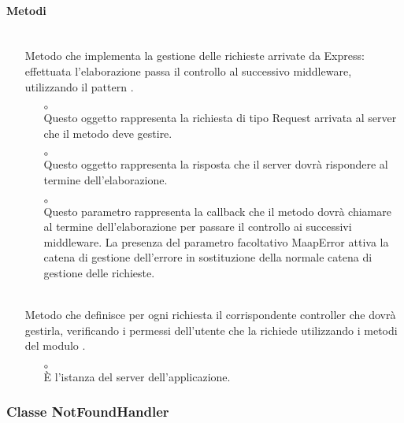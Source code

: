 \paragraph*{Metodi}
\begin{itemize}
\item[]  \\ Metodo che implementa la gestione delle richieste arrivate da Express: effettuata l'elaborazione passa il controllo al successivo middleware, utilizzando il pattern .
\begin{itemize}\addtolength{\itemsep}{-0.5\baselineskip}
\item[$\circ$]  \\ Questo oggetto rappresenta la richiesta di tipo Request arrivata al server che il metodo deve gestire.
\item[$\circ$]  \\ Questo oggetto rappresenta la risposta che il server dovrà rispondere al termine dell'elaborazione.
\item[$\circ$]  \\ Questo parametro rappresenta la callback che il metodo dovrà chiamare al termine dell'elaborazione per passare il controllo ai successivi middleware.
La presenza del parametro facoltativo MaapError attiva la catena di gestione dell'errore in sostituzione della normale catena di gestione delle richieste.
\end{itemize}
\item[]  \\ Metodo che definisce per ogni richiesta il corrispondente controller che dovrà gestirla, verificando i permessi dell'utente che la richiede utilizzando i metodi del modulo .

\begin{itemize}\addtolength{\itemsep}{-0.5\baselineskip}
\item[$\circ$]  \\ È l'istanza del server dell'applicazione.
\end{itemize}
\end{itemize}

\subsubsection{Classe NotFoundHandler}

